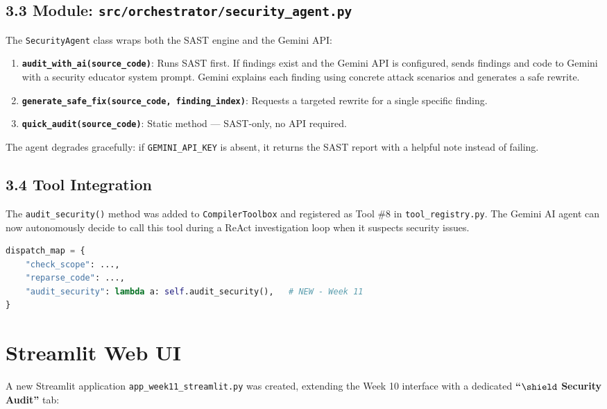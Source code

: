 \documentclass[a4paper,11pt]{article}
\begin{document}
\subsection{3.3 Module: \texttt{src/orchestrator/security\_agent.py}}

The \texttt{SecurityAgent} class wraps both the SAST engine and the Gemini API:

\begin{enumerate}
    \item \textbf{\texttt{audit\_with\_ai(source\_code)}}: Runs SAST first. If findings exist and the Gemini API is configured, sends findings and code to Gemini with a security educator system prompt. Gemini explains each finding using concrete attack scenarios and generates a safe rewrite.
    \item \textbf{\texttt{generate\_safe\_fix(source\_code, finding\_index)}}: Requests a targeted rewrite for a single specific finding.
    \item \textbf{\texttt{quick\_audit(source\_code)}}: Static method — SAST-only, no API required.
\end{enumerate}

The agent degrades gracefully: if \texttt{GEMINI\_API\_KEY} is absent, it returns the SAST report with a helpful note instead of failing.

\subsection{3.4 Tool Integration}

The \texttt{audit\_security()} method was added to \texttt{CompilerToolbox} and registered as Tool \#8 in \texttt{tool\_registry.py}. The Gemini AI agent can now autonomously decide to call this tool during a ReAct investigation loop when it suspects security issues.

\begin{lstlisting}[language=Python, caption=audit\_security() in CompilerToolbox.dispatch()]
dispatch_map = {
    "check_scope": ...,
    "reparse_code": ...,
    "audit_security": lambda a: self.audit_security(),   # NEW - Week 11
}
\end{lstlisting}

\section{Streamlit Web UI}

A new Streamlit application \texttt{app\_week11\_streamlit.py} was created, extending the Week 10 interface with a dedicated \textbf{``\(\shield\) Security Audit''} tab:
\end{document}
